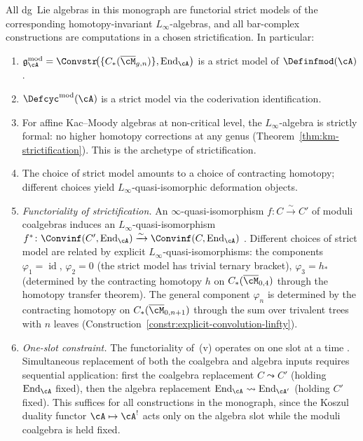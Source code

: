 \begin{corollary}
\label{cor:strictification-comparison}
All dg~Lie algebras in this monograph are functorial strict models
of the corresponding homotopy-invariant $L_\infty$-algebras, and
all bar-complex constructions are computations in a chosen
strictification.  In particular:
\begin{enumerate}[label=\textup{(\roman*)}]
\item $\mathfrak{g}_{\cA}^{\mathrm{mod}} =
  \Convstr\!\bigl(\{C_*(\overline{\cM}_{g,n})\},
  \operatorname{End}_{\cA}\bigr)$ is a strict model of
  $\Definfmod(\cA)$.
\item $\Defcyc^{\mathrm{mod}}(\cA)$ is a strict model via the
  coderivation identification.
\item For affine Kac--Moody algebras at non-critical level, the
  $L_\infty$-algebra is strictly formal: no higher homotopy
  corrections at any genus
  \textup{(}Theorem~\textup{\ref{thm:km-strictification})}.
  This is the archetype of strictification.
\item The choice of strict model amounts to a choice of
  contracting homotopy; different choices yield
  $L_\infty$-quasi-isomorphic deformation objects.
\item \emph{Functoriality of strictification.}
  An $\infty$-quasi-isomorphism $f\colon C \xrightarrow{\sim} C'$
  of moduli coalgebras induces an $L_\infty$-quasi-isomorphism
  $f^*\colon \Convinf(C',\operatorname{End}_\cA) \xrightarrow{\sim}
  \Convinf(C,\operatorname{End}_\cA)$
  \cite[Theorem~5.1, Proposition~5.5]{RNW19}.
  Different choices of strict model are related by explicit
  $L_\infty$-quasi-isomorphisms: the components
  $\varphi_1 = \operatorname{id}$,
  $\varphi_2 = 0$ (the strict model has trivial ternary bracket),
  $\varphi_3 = h_*$ (determined by the contracting homotopy $h$ on
  $C_*(\overline{\cM}_{0,4})$ through the homotopy transfer
  theorem).  The general component $\varphi_n$ is determined by the
  contracting homotopy on $C_*(\overline{\cM}_{0,n+1})$ through the
  sum over trivalent trees with $n$ leaves
  \textup{(}Construction~\textup{\ref{constr:explicit-convolution-linfty})}.
\item \emph{One-slot constraint.}
  The functoriality of~(v) operates on one slot at a time
  \cite[Theorem~6.6]{RNW19}.
  Simultaneous replacement of both the coalgebra and algebra
  inputs requires sequential application: first the coalgebra
  replacement $C \leadsto C'$ \textup{(}holding $\operatorname{End}_\cA$
  fixed\textup{)}, then the algebra replacement
  $\operatorname{End}_\cA \leadsto \operatorname{End}_{\cA'}$
  \textup{(}holding $C'$ fixed\textup{)}.
  This suffices for all constructions in the monograph, since
  the Koszul duality functor $\cA \mapsto \cA^!$ acts only on the
  algebra slot while the moduli coalgebra is held fixed.
\end{enumerate}
\end{corollary}

